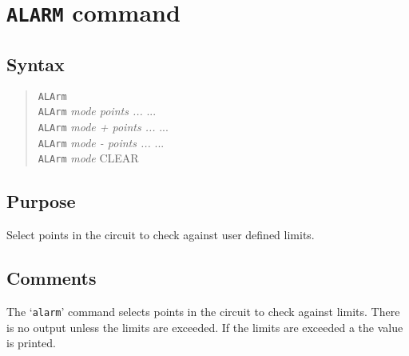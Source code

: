 %
%
%
%
\section{{\tt ALARM} command}
\subsection{Syntax}
\begin{verse}
{\tt ALArm}\\
{\tt ALArm} {\it mode points ...} ...\\
{\tt ALArm} {\it mode + points ...} ...\\
{\tt ALArm} {\it mode - points ...} ...\\
{\tt ALArm} {\it mode} CLEAR
\end{verse}
\subsection{Purpose}

Select points in the circuit to check against user defined limits.
\subsection{Comments}

The `{\tt alarm}' command selects points in the circuit to check
against limits.  There is no output unless the limits are exceeded.
If the limits are exceeded a the value is printed.

